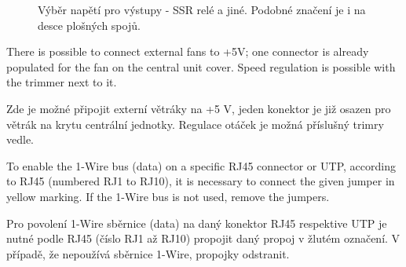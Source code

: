 \begin{Czech}
\begin{figure}[H]
    \centering
    \def\svgwidth{0.25\columnwidth}
    \graphicspath{{pictures/all/hardware/svg/}}
    
    \caption{Výběr napětí pro výstupy - SSR relé a jiné. Podobné značení je i na desce plošných spojů.}
    \label{fig:pin-header-relays}
\end{figure}
\end{Czech}


\begin{English}
\end{English}

\begin{Czech}
\end{Czech}


\begin{English}
There is possible to connect external fans to +5V; one connector is already populated for the fan on the central unit cover. Speed regulation is possible with the trimmer next to it.
\end{English}

\begin{Czech}
Zde je možné připojit externí větráky na +5 V, jeden konektor je již osazen pro větrák na krytu centrální jednotky. Regulace otáček je možná příslušný trimry vedle.
\end{Czech}


\begin{English}
\end{English}

\begin{Czech}
\end{Czech}


\begin{English}
To enable the 1-Wire bus (data) on a specific RJ45 connector or UTP, according to RJ45 (numbered RJ1 to RJ10), it is necessary to connect the given jumper in yellow marking. If the 1-Wire bus is not used, remove the jumpers.
\end{English}

\begin{Czech}
Pro povolení 1-Wire sběrnice (data) na daný konektor RJ45 respektive UTP je nutné podle RJ45 (číslo RJ1 až RJ10) propojit daný propoj v žlutém označení. V případě, že nepoužívá sběrnice 1-Wire, propojky odstranit.
\end{Czech}


